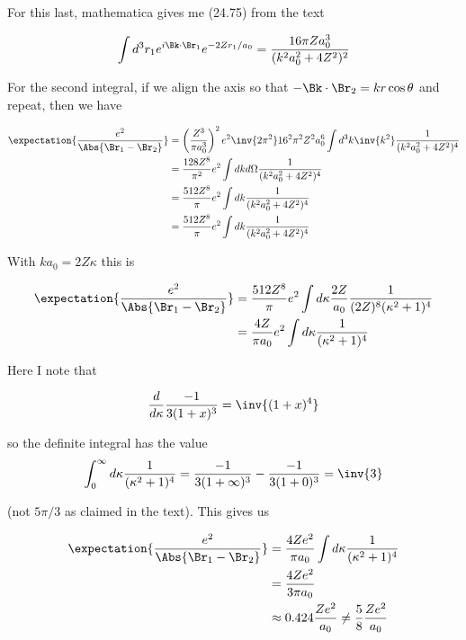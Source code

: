 For this last, mathematica gives me (24.75) from the text

\begin{equation}\label{eqn:qmTwoL6:n}
\int 
d^3 r_1 
e^{i \Bk \cdot \Br_1 } e^{ -2 Z r_1 /a_0} 
=
\frac{ 16 \pi Z a_0^3 }{(k^2 a_0^2 + 4 Z^2)^2}
\end{equation}

For the second integral, if we align the axis so that $-\Bk \cdot \Br_2 = k r \cos\theta$ and repeat, then we have

\begin{align*}
\expectation{\frac{e^2}{\Abs{\Br_1 - \Br_2}}}
&=
\left( \frac{Z^3}{\pi a_0^3}\right)^2 e^2
\inv{2 \pi^2} 
16^2 \pi^2 Z^2 a_0^6 
\int d^3 k \inv{k^2}
\frac{ 1 }{(k^2 a_0^2 + 4 Z^2)^4} \\
&=
\frac{128 Z^8}{\pi^2 } e^2
\int dk d\Omega 
\frac{ 1 }{(k^2 a_0^2 + 4 Z^2)^4} \\
&=
\frac{512 Z^8}{\pi} e^2
\int dk 
\frac{ 1 }{(k^2 a_0^2 + 4 Z^2)^4} \\
&=
\frac{512 Z^8}{\pi} e^2
\int dk 
\frac{ 1 }{(k^2 a_0^2 + 4 Z^2)^4} \\
\end{align*}

With $k a_0 = 2 Z \kappa$ this is

\begin{align*}
\expectation{\frac{e^2}{\Abs{\Br_1 - \Br_2}}}
&=
\frac{512 Z^8}{\pi} e^2
\int d\kappa 
\frac{ 2 Z }{a_0}
\frac{ 1 }{(2 Z)^8 (\kappa^2 + 1)^4} \\
&=
\frac{4 Z}{\pi a_0} e^2
\int d\kappa 
\frac{ 1 }{(\kappa^2 + 1)^4} \\
\end{align*}

Here I note that 

\begin{align*}
\frac{d}{d\kappa}
\frac{-1}{ 3 (1+x)^3 }
=
\inv{ (1+x)^4 }
\end{align*}

so the definite integral has the value
\begin{align*}
\int_0^\infty d\kappa 
\frac{ 1 }{ (\kappa^2 + 1)^4} 
=
\frac{-1}{ 3 (1+\infty)^3 }
-
\frac{-1}{ 3 (1+0)^3 }
= \inv{3}
\end{align*}

(not $5 \pi/3$ as claimed in the text).  This gives us

\begin{align*}
\expectation{\frac{e^2}{\Abs{\Br_1 - \Br_2}}}
&=
\frac{4 Z e^2} { \pi a_0 } 
\int d\kappa 
\frac{ 1 }{(\kappa^2 + 1)^4} \\
&=
\frac{4 Z e^2} { 3 \pi a_0 }  \\
&\approx 0.424 \frac{Z e^2 }{a_0} \ne \frac{5}{8} \frac{Z e^2 }{a_0}
\end{align*}

\EndNoBibArticle
